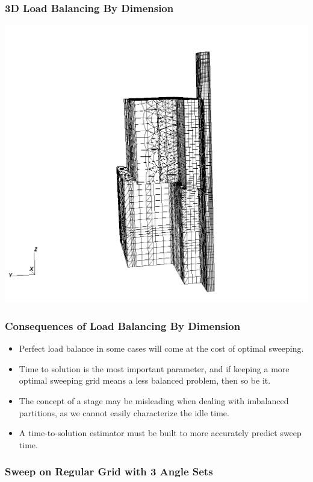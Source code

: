 \documentclass[xcolor={usenames,dvipsnames,svgnames,table}]{beamer}
\begin{document}
\begin{frame}[t]\frametitle{3D Load Balancing By Dimension}
\centering
\includegraphics[trim={0cm 1cm 0cm 3cm},clip,scale=0.27]{figures/im1_foam_448.png}
\end{frame}

\begin{frame}[t]\frametitle{Consequences of Load Balancing By Dimension}
  \begin{block}{}
  \begin{itemize}
    \item Perfect load balance in some cases will come at the cost of optimal sweeping.
    \item Time to solution is the most important parameter, and if keeping a more optimal sweeping grid means a less balanced problem, then so be it.
    \item The concept of a stage may be misleading when dealing with imbalanced partitions, as we cannot easily characterize the idle time.
    \item A time-to-solution estimator must be built to more accurately predict sweep time.
  \end{itemize}
  \end{block}
\end{frame}

\begin{frame}[t]\frametitle{Sweep on Regular Grid with 3 Angle Sets}
\end{frame}
\end{document}
